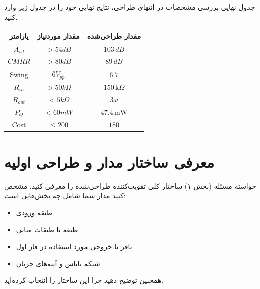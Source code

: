 \documentclass[12pt,a4paper]{article}
\begin{document}
\begin{answerbox}{جدول نهایی بررسی مشخصات}
در انتهای طراحی، نتایج نهایی خود را در جدول زیر وارد کنید.
\begin{center}
\begin{tabular}{|c|c|c|}
\hline
\textbf{پارامتر} & \textbf{مقدار موردنیاز} & \textbf{مقدار طراحی‌شده}  \\
\hline
$A_{vd}$ & $>54dB$ & $103 \, dB$ \\
\hline
$CMRR$ & $>80dB$ & $89 \, dB$\\
\hline
Swing & $6V_{pp}$ & $6.7$\\
\hline
$R_{in}$ & $>50k\Omega$ & $150 \, \text{k}\Omega$ \\
\hline
$R_{out}$ & $<5k\Omega$ & $3 \omega$\\
\hline
$P_Q$ & $<60mW$ & $47.4 \, \text{mW}$\\
\hline
Cost & $\le 200$ & $180$\\
\hline
\end{tabular}
\end{center}
\end{answerbox}

\newpage

\section{معرفی ساختار مدار و طراحی اولیه}

\begin{taskbox}{خواسته مسئله (بخش ۱)}
ساختار کلی تقویت‌کننده طراحی‌شده را معرفی کنید. مشخص کنید مدار شما شامل چه بخش‌هایی است:
\begin{itemize}
    \item طبقه ورودی
    \item طبقه یا طبقات میانی
    \item بافر یا خروجی مورد استفاده در فاز اول
    \item شبکه بایاس و آینه‌های جریان
\end{itemize}
همچنین توضیح دهید چرا این ساختار را انتخاب کرده‌اید.
\end{taskbox}
\end{document}
